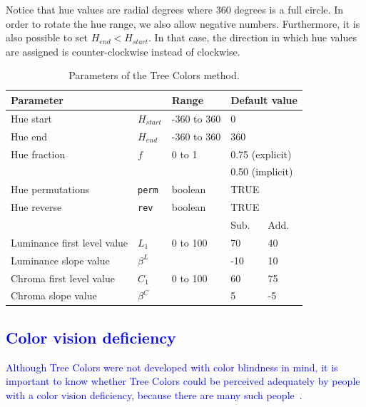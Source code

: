 \documentclass[journal]{vgtc}                %
\newcommand{\changedM}[1]{\textcolor{blue}{#1}}
\begin{document}
Notice that hue values are radial degrees where 360 degrees is a full circle. In order to rotate the hue range, we also allow negative numbers. Furthermore, it is also possible to set $H_{end} < H_{start}$. In that case, the direction in which hue values are assigned is counter-clockwise instead of clockwise.

\begin{table}[!htb]
\begin{footnotesize}
\begin{center}
\begin{tabular}{lllll}
\toprule
\multicolumn{2}{l}{Parameter    } & Range & \multicolumn{2}{l}{Default value} \\
\midrule
Hue start 				& $H_{start}$ &-360 to 360  & \multicolumn{2}{l}{0}      \\
Hue end   				& $H_{end}$ & -360 to 360 & \multicolumn{2}{l}{360}       \\
Hue fraction 				& $f$	& 0 to 1 & \multicolumn{2}{l}{0.75 (explicit)} \\
					&	&	 & \multicolumn{2}{l}{0.50 (implicit)} \\
Hue permutations 			& \texttt{perm} & boolean & \multicolumn{2}{l}{TRUE}      \\
Hue reverse   			& \texttt{rev} & boolean  & \multicolumn{2}{l}{TRUE}    \\
\cmidrule(r){4-5}
					&		&		& Sub. & Add. \\
\cmidrule(r){4-5}
Luminance first level value 	& $L_1$	& 0 to 100  & 70 & 40      \\
Luminance slope value 		& $\beta^L$ &       & -10  & 10      \\
Chroma first level value 		& $C_1$ &  0 to 100  & 60   & 75    \\
Chroma slope value 		& $\beta^C$ &     & 5   & -5    \\
\bottomrule
\end{tabular}
\end{center}
\end{footnotesize}
\caption{Parameters of the Tree Colors method.}\label{table:param}
\end{table}

\subsection{\changedM{Color vision deficiency}}
\changedM{Although Tree Colors were not developed with color blindness in mind, it is important to know whether Tree Colors could be perceived adequately by people with a color vision deficiency, because there are many such people~\cite{birch12}.}
\end{document}
